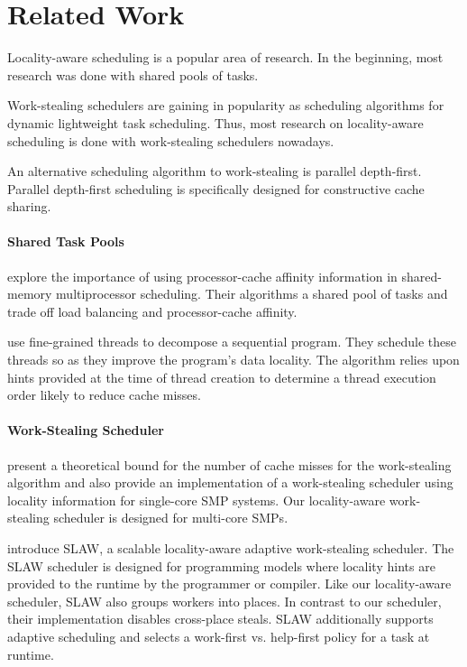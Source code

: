 
\chapter{Related Work}
\label{chap:locality-related-work}

Locality-aware scheduling is a popular area of research. In the
beginning, most research was done with shared pools of tasks.

Work-stealing schedulers are gaining in popularity as scheduling
algorithms for dynamic lightweight task scheduling. Thus, most
research on locality-aware scheduling is done with work-stealing
schedulers nowadays.

An alternative scheduling algorithm to work-stealing is parallel
depth-first. Parallel depth-first scheduling is specifically designed
for constructive cache sharing.

\subsubsection{Shared Task Pools}

\textcite{Squillante1993} explore the importance of using
processor-cache affinity information in shared-memory multiprocessor
scheduling. Their algorithms a shared pool of tasks and trade off load
balancing and processor-cache affinity.

\textcite{Philbin1996} use fine-grained threads to decompose a
sequential program. They schedule these threads so as they improve the
program's data locality. The algorithm relies upon hints provided at
the time of thread creation to determine a thread execution order
likely to reduce cache misses.

\subsubsection{Work-Stealing Scheduler}

\textcite{Acar2000} present a theoretical bound for the number of
cache misses for the work-stealing algorithm and also provide an
implementation of a work-stealing scheduler using locality information
for single-core SMP systems. Our locality-aware work-stealing
scheduler is designed for multi-core SMPs.

\textcite{Guo2010} introduce SLAW, a scalable locality-aware adaptive
work-stealing scheduler. The SLAW scheduler is designed for
programming models where locality hints are provided to the runtime by
the programmer or compiler. Like our locality-aware scheduler, SLAW
also groups workers into places. In contrast to our scheduler, their
implementation disables cross-place steals. SLAW additionally supports
adaptive scheduling and selects a work-first vs. help-first policy for
a task at runtime.

